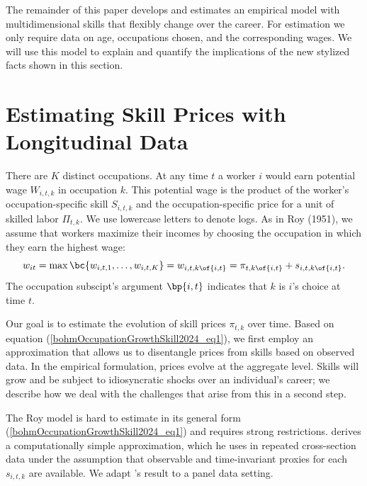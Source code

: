 \documentclass[12pt]{article}
\theoremstyle{definition}
\begin{document}
The remainder of this paper develops and estimates an empirical model with multidimensional skills that flexibly change over the career. For estimation we only require data on age, occupations chosen, and the corresponding wages. We will use this model to explain and quantify the implications of the new stylized facts shown in this section.

\section{Estimating Skill Prices with Longitudinal Data}

There are $K$ distinct occupations. At any time $t$ a worker $i$ would earn potential wage $W_{i, t, k}$ in occupation $k$. This potential wage is the product of the worker's occupation-specific skill $S_{i, t, k}$ and the occupation-specific price for a unit of skilled labor $\Pi_{t, k}$. We use lowercase letters to denote logs. As in Roy (1951), we assume that workers maximize their incomes by choosing the occupation in which they earn the highest wage:
\begin{equation}
    \label{bohmOccupationGrowthSkill2024_eq1}
    w_{it} = \max\bc{w_{i,t,1}, \ldots, w_{i,t,K}} = w_{i, t, k\of{i,t}} = \pi_{t, k\of{i,t}} + s_{i, t, k\of{i,t}}.
\end{equation}
The occupation subscipt's argument $\bp{i,t}$ indicates that $k$ is $i$'s choice at time $t$.

Our goal is to estimate the evolution of skill prices $\pi_{t,k}$ over time. Based on equation (\ref{bohmOccupationGrowthSkill2024_eq1}), we first employ an approximation that allows us to disentangle prices from skills based on observed data. In the empirical formulation, prices evolve at the aggregate level. Skills will grow and be subject to idiosyncratic shocks over an individual's career; we describe how we deal with the challenges that arise from this in a second step.

The Roy model is hard to estimate in its general form (\ref{bohmOccupationGrowthSkill2024_eq1}) and requires strong restrictions. \citet{bohmPricePolarizationEstimating2020} derives a computationally simple approximation, which he uses in repeated cross-section data under the assumption that observable and time-invariant proxies for each $s_{i,t,k}$ are available. We adapt \citeauthor{bohmPricePolarizationEstimating2020}'s result to a panel data setting.
\end{document}
